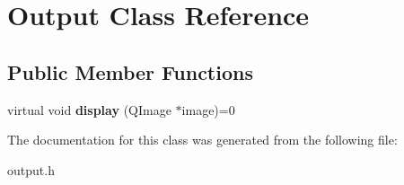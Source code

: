 \hypertarget{classOutput}{
\section{\-Output \-Class \-Reference}
\label{classOutput}
}
\subsection*{\-Public \-Member \-Functions}
\begin{DoxyCompactItemize}
\item 
\hypertarget{classOutput_a19498a11cd54ec7026a3ff489b94292e}{
virtual void {\bfseries display} (\-Q\-Image $\ast$image)=0}
\label{classOutput_a19498a11cd54ec7026a3ff489b94292e}

\end{DoxyCompactItemize}


\-The documentation for this class was generated from the following file\-:\begin{DoxyCompactItemize}
\item 
output.\-h\end{DoxyCompactItemize}
